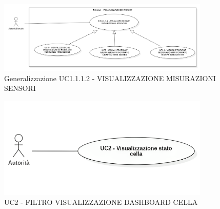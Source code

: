 





\begin{figure}[H]
    \centering
    \includegraphics[width=0.9\textwidth]{../Images/uc1.1.1.2Gen.PNG}
    \caption{Generalizzazione UC1.1.1.2 - VISUALIZZAZIONE MISURAZIONI SENSORI }
    \label{fig:UC3_gen}
\end{figure}

\newpage









\begin{figure}[H]
    \centering
    \includegraphics[width=0.9\textwidth]{../Images/uc2.png}
    \caption{UC2 - FILTRO VISUALIZZAZIONE DASHBOARD CELLA }
    \label{fig:UC2}
\end{figure}

